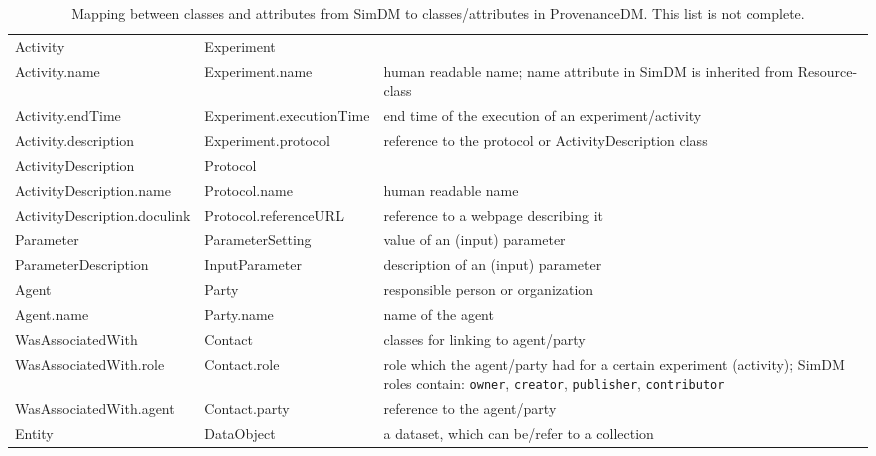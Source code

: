 \begin{table}[ht]
\small
{}\textwidth
\begin{tabulary}{1.0\textwidth}{@{}Llp{5cm}@{}}
\toprule
{} &  & \\
\midrule
Activity               & Experiment      &  \\
Activity.name          & Experiment.name & human readable name; name attribute in SimDM is inherited from Resource-class\\
Activity.endTime & Experiment.executionTime  & end time of the execution of an experiment/activity \\
Activity.description & Experiment.protocol & reference to the protocol or ActivityDescription class \\
ActivityDescription    & Protocol        & \\
ActivityDescription.name  & Protocol.name   & human readable name\\
ActivityDescription.doculink & Protocol.referenceURL & reference to a webpage describing it\\
Parameter              & ParameterSetting     & value of an (input) parameter\\
ParameterDescription   & InputParameter       & description of an (input) parameter\\
Agent           & Party           & responsible person or organization\\
Agent.name      & Party.name      & name of the agent \\
WasAssociatedWith & Contact         & classes for linking to agent/party\\
WasAssociatedWith.role & Contact.role    & role which the agent/party had for a certain experiment (activity); SimDM roles contain: \texttt{owner}, \texttt{creator}, \texttt{publisher}, \texttt{contributor}\\
WasAssociatedWith.agent & Contact.party    & reference to the agent/party \\
Entity        & DataObject     & a dataset, which can be/refer to a collection\\

\bottomrule
\end{tabulary}
\caption[Mapping between classes and attributes from SimDM to classes/attributes in ProvenanceDM]{Mapping between classes and attributes from SimDM to classes/attributes in ProvenanceDM. This list is not complete.}
\label{tab:simdmmapping}
\end{table}

